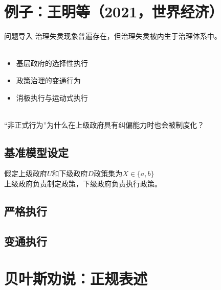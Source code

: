 \documentclass{beamer}
\begin{document}
\section{例子：王明等（2021，世界经济）}

\begin{frame}{问题导入}
	治理失灵现象普遍存在，但治理失灵被内生于治理体系中。\\~\\
	\begin{itemize}
		\item 基层政府的选择性执行
		\item 政策治理的变通行为
		\item 消极执行与运动式执行 \\~\\
	\end{itemize}
	
	“非正式行为”为什么在上级政府具有纠偏能力时也会被制度化？\\
	
\end{frame}

\subsection{基准模型设定}

\begin{frame}
	假定上级政府$U$和下级政府$D$政策集为$X\in\{a,b\}$\\
	上级政府负责制定政策，下级政府负责执行政策。\\
\end{frame}
\subsection{严格执行}

\subsection{变通执行}

\section{贝叶斯劝说：正规表述}
\end{document}
